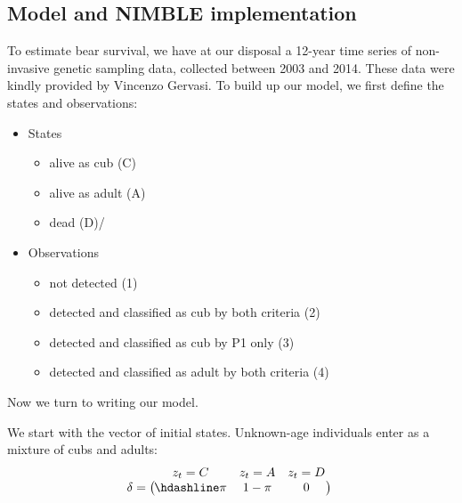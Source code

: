\documentclass[
  12pt,
]{krantz}
\providecommand{\tightlist}{%
  \setlength{\itemsep}{0pt}\setlength{\parskip}{0pt}}
\begin{document}
\subsection{Model and NIMBLE implementation}\label{model-and-nimble-implementation-1}

To estimate bear survival, we have at our disposal a 12-year time series of non-invasive genetic sampling data, collected between 2003 and 2014. These data were kindly provided by Vincenzo Gervasi. To build up our model, we first define the states and observations:

\begin{itemize}
\tightlist
\item
  States

  \begin{itemize}
  \tightlist
  \item
    alive as cub (C)
  \item
    alive as adult (A)
  \item
    dead (D)/
  \end{itemize}
\item
  Observations

  \begin{itemize}
  \tightlist
  \item
    not detected (1)
  \item
    detected and classified as cub by both criteria (2)
  \item
    detected and classified as cub by P1 only (3)
  \item
    detected and classified as adult by both criteria (4)
  \end{itemize}
\end{itemize}

Now we turn to writing our model.

We start with the vector of initial states. Unknown-age individuals enter as a mixture of cubs and adults:
\[\begin{matrix}
& \\
\mathbf{\delta} =
  \left ( \vphantom{ \begin{matrix} 12 \end{matrix} } \right .
          \end{matrix}
          \hspace{-1.2em}
          \begin{matrix}
          z_t=C & z_t=A & z_t=D \\ \hdashline
          \pi & 1 - \pi & 0\\
          \end{matrix}
          \hspace{-0.2em}
          \begin{matrix}
          & \\
          \left . \vphantom{ \begin{matrix} 12 \end{matrix} } \right )
\begin{matrix}
\end{matrix}
\end{matrix}\]
\end{document}
